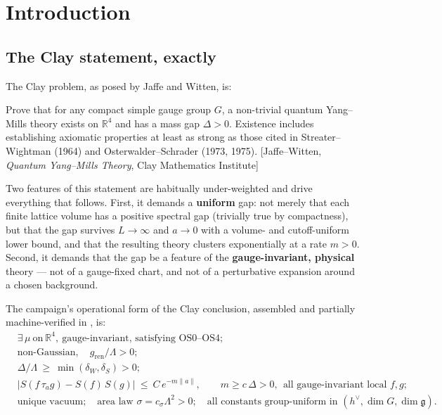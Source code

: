 \section{Introduction}
\label{sec:intro}

\subsection{The Clay statement, exactly}

The Clay problem, as posed by Jaffe and Witten, is:

\begin{qbox}
Prove that for any compact simple gauge group $G$, a non-trivial quantum Yang--Mills theory
exists on $\mathbb{R}^4$ and has a mass gap $\Delta>0$. Existence includes establishing
axiomatic properties at least as strong as those cited in Streater--Wightman (1964) and
Osterwalder--Schrader (1973, 1975). [Jaffe--Witten, \emph{Quantum Yang--Mills Theory}, Clay
Mathematics Institute]
\end{qbox}

Two features of this statement are habitually under-weighted and drive everything that
follows. First, it demands a \textbf{uniform} gap: not merely that each finite lattice volume
has a positive spectral gap (trivially true by compactness), but that the gap survives
$L\to\infty$ and $a\to0$ with a volume- and cutoff-uniform lower bound, and that the resulting
theory clusters exponentially at a rate $m>0$. Second, it demands that the gap be a feature of
the \textbf{gauge-invariant, physical} theory --- not of a gauge-fixed chart, and not of a
perturbative expansion around a chosen background.

The campaign's operational form of the Clay conclusion, assembled and partially
machine-verified in , is:
\begin{align*}
&\exists\,\mu\ \text{on}\ \mathbb{R}^4,\ \text{gauge-invariant, satisfying OS0--OS4};\\
&\text{non-Gaussian},\quad g_{\mathrm{ren}}/\Lambda>0;\\
&\Delta/\Lambda\ \ge\ \min(\delta_W,\delta_S)>0;\\
&|S(f\,\tau_a g)-S(f)\,S(g)|\ \le\ C\,e^{-m\|a\|},\qquad
  m\ge c\,\Delta>0,\ \ \text{all gauge-invariant local } f,g;\\
&\text{unique vacuum};\quad \text{area law } \sigma=c_\sigma\Lambda^2>0;\quad
  \text{all constants group-uniform in } (h^{\vee},\dim G,\dim\mathfrak{g}).
\end{align*}


